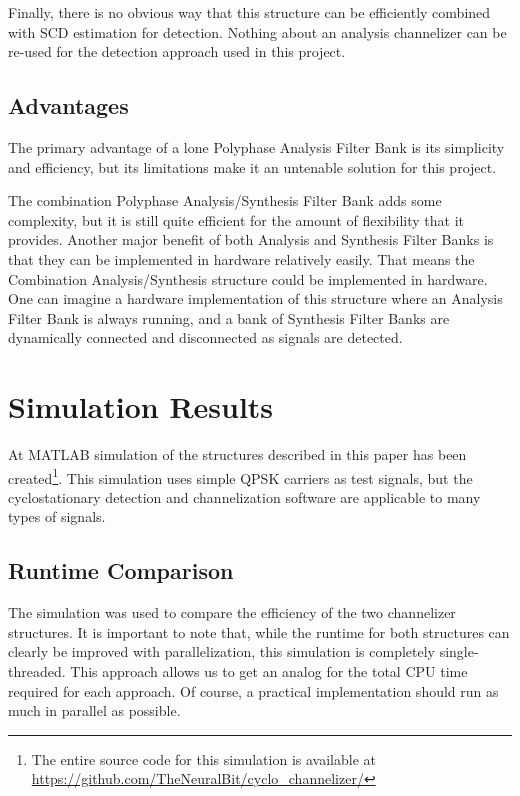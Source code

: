 \documentclass[12pt]{article}
\begin{document}
Finally, there is no obvious way that this structure can be efficiently
combined with SCD estimation for detection. Nothing about an analysis
channelizer can be re-used for the detection approach used in this project.

\subsection{Advantages}
\label{sec:poly_advantages}
The primary advantage of a lone Polyphase Analysis Filter Bank is its
simplicity and efficiency, but its limitations make it an untenable solution
for this project.

The combination Polyphase Analysis/Synthesis Filter Bank adds some complexity,
but it is still quite efficient for the amount of flexibility that it provides.
Another major benefit of both Analysis and Synthesis Filter Banks is that they
can be implemented in hardware relatively easily. That means the Combination
Analysis/Synthesis structure could be implemented in hardware. One can imagine
a hardware implementation of this structure where an Analysis Filter Bank is
always running, and a bank of Synthesis Filter Banks are dynamically connected
and disconnected as signals
are detected.



\section{Simulation Results}
\label{sec:sim}

At MATLAB simulation of the structures described in this paper has been
created\footnote{The entire source code for this simulation is available at
\url{https://github.com/TheNeuralBit/cyclo_channelizer/}}. This simulation uses
simple QPSK carriers as test signals, but the cyclostationary detection
and channelization software are applicable to many types of signals.

\subsection{Runtime Comparison}
\label{sec:sim_runtime}

The simulation was used to compare the efficiency of the two channelizer
structures. It is important to note that, while the runtime for both structures
can clearly be improved with parallelization, this simulation is completely
single-threaded. This approach allows us to get an analog for the total CPU
time required for each approach. Of course, a practical implementation should
run as much in parallel as possible.
\end{document}

